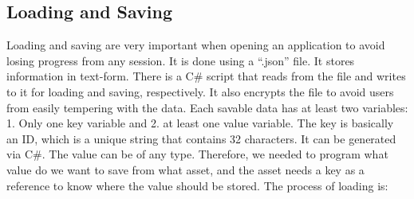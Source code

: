 \subsection{Loading and Saving}
Loading and saving are very important when opening an application to avoid losing progress from any session. It is done using a “.json” file. It stores information in text-form. There is a C\# script that reads from the file and writes to it for loading and saving, respectively. It also encrypts the file to avoid users from easily tempering with the data. Each savable data has at least two variables: 1. Only one key variable and 2. at least one value variable. The key is basically an ID, which is a unique string that contains 32 characters. It can be generated via C\#. The value can be of any type. Therefore, we needed to program what value do we want to save from what asset, and the asset needs a key as a reference to know where the value should be stored. The process of loading is:

